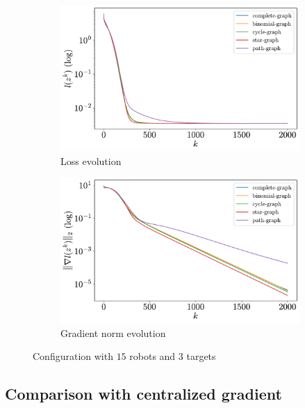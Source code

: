 \documentclass[a4paper,11pt,oneside]{book}
\begin{document}
\begin{figure}[H]
      \centering
      \begin{subfigure}[t]{0.49\textwidth}
            \centering
            \includegraphics[width=\linewidth]{./figs/tracking/loss_15_3_2_2000.pdf} 
            \caption{Loss evolution}
      \end{subfigure}
      \hfill
      \begin{subfigure}[t]{0.49\textwidth}
            \centering
            \includegraphics[width=\linewidth]{./figs/tracking/gradient_15_3_2_2000.pdf} 
            \caption{Gradient norm evolution}
      \end{subfigure}
      \caption{Configuration with $15$ robots and $3$ targets}
      \label{fig:tracking_15_3}
\end{figure}



\subsection{Comparison with centralized gradient}
\end{document}
